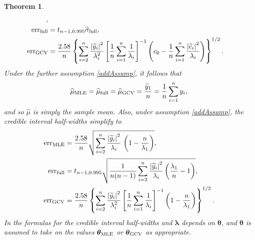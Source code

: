 \documentclass{iitthesis}          %
\newcommand{\bm}[1]{\boldsymbol{#1}}
\newcommand{\vlambda}{{\bm{\lambda}}}
\newcommand{\vtheta}{{\bm{\theta}}}
\newcommand{\hmu}{\widehat{\mu}}
\newcommand{\hsigma}{\widehat{\sigma}}
\newcommand{\MLE}{\textup{MLE}}
\newcommand{\full}{\textup{full}}
\newcommand{\GCV}{\textup{GCV}}
\newcommand{\err}{\textup{err}}
\def\abs#1{\ensuremath{\left \lvert #1 \right \rvert}}
\newtheorem{theorem}{Theorem}[section]
\begin{document}
\begin{theorem}
\begin{align}
{	}, \\
	\nonumber
	\err_{\full} & = t_{n-1,0.995} \hsigma_{\textup{full}}, \\
	\nonumber
	\err_{\textup{GCV}} & =
	\frac{2.58}{n}\left\{\sum_{i=2}^n \frac{\abs{\widetilde{y}_i}^2}{\lambda_i^2}  \left [ \frac 1n \sum_{i=1}^n \frac{1}{\lambda_i} \right]^{-1} 
	\left( c_0 - \frac 1n \sum_{i=1}^n \frac{\abs{\widetilde{c}_i}^2}{\lambda_i} \right) 
	\right\}^{1/2}.
	\end{align}
	Under the further assumption \eqref{addAssump}, it follows that 
	\begin{equation}
	\label{muhatGCV-FB-MLE-Simple}
	\hmu_\MLE  = \hmu_{\full} = \hmu_{\GCV} =
	\frac{\widetilde{y}_1}{n} = \frac 1n \sum_{i=1}^n y_i,
	\end{equation}
	and so $\hmu$ is simply the sample mean.  Also, under assumption \eqref{addAssump}, the credible interval half-widths simplify to
	\begin{subequations}
		\label{errSimple}
		\begin{align}
		\label{eq:errMLEAllAsump}
		\err_\MLE  &
		=
		\frac{2.58}{n}\sqrt{
			\sum_{i=2}^{n} \frac{\abs{\widetilde{y}_i}^2}{\lambda_i}  
			\,
			\left( 1 -  \frac{n}{\lambda_1} \right) 
		}, \\
		\label{FJH:eq:errFullSimple}
		\err_{\textup{full}}
		&=
		t_{n-1,0.995}
		\sqrt{\frac{1}{n(n-1)} \sum_{i=2}^n \frac{\abs{\widetilde{y}_i}^2}{\lambda_i}  \left(\frac{\lambda_1}{n}  - 1  \right)}, \\
		\label{errGCVSimple}
		\err_{\textup{GCV}} & =
		\frac{2.58}{n}\left\{\sum_{i=2}^n \frac{\abs{\widetilde{y}_i}^2}{\lambda_i^2}  \left [ \frac 1n \sum_{i=1}^n \frac{1}{\lambda_i} \right]^{-1} 
		\left( 1 -  \frac{n}{\lambda_1} \right)  
		\right\}^{1/2}. 
		\end{align}
	\end{subequations}
	In the formulas for the credible interval half-widths and $\vlambda$ depends on $\vtheta$, and  $\vtheta$ is assumed to take on the values $\vtheta_{\MLE}$ or $\vtheta_{\GCV}$ as appropriate.
\end{theorem}


\fi









\label{sec:shift_invariant_kernel}
\end{document}
